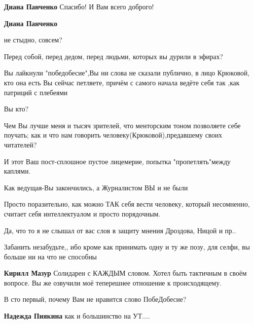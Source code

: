 \begin{itemize}
\begin{itemize}
\textbf{Диана Панченко} Спасибо! И Вам всего доброго!

 
\textbf{Диана Панченко} 

не стыдно, совсем?

Перед собой, перед дедом, перед людьми, которых вы дурили в эфирах?

Вы лайкнули "победобесие",Вы ни слова не сказали публично, в лицо Крюковой, кто
она есть Вы сейчас петляете, причём с самого начала ведёте себя так ,как
патриций с плебеями

Вы кто?

Чем Вы лучше меня и тысяч зрителей, что менторским тоном позволяете себе
поучать; как и что нам говорить человеку(Крюковой),предавшему своих читателей?

И этот Ваш пост-сплошное пустое лицемерие, попытка "пропетлять"между каплями.

Как ведущая-Вы закончились, а Журналистом ВЫ и не были

Просто поразительно, как можно ТАК себя вести человеку, который
несомненно, считает себя интеллектуалом и просто порядочным.

Да, что то я не слышал от вас слов в защиту мнения Дроздова, Ницой и пр..

Забанить незабудьте,, ибо кроме как принимать одну и ту же позу, для селфи, вы
больше ни на что не способны


 
\textbf{Кирилл Мазур} Солидарен с КАЖДЫМ словом. Хотел быть тактичным в своём
вопросе. Вы же озвучили моё теперешнее отношение к происходящему.

 
В сто первый, почему Вам не нравится слово ПобеДобесие?

 
\textbf{Надежда Пиякина} как и большинство на УТ....

\end{itemize}

\end{itemize}

